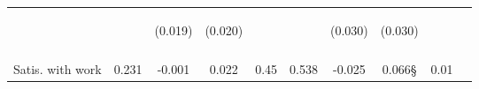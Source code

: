 \begin{tabular}{lccccccccc}
 & \begin{footnotesize}\end{footnotesize} & \begin{footnotesize}(0.019)\end{footnotesize} & \begin{footnotesize}(0.020)\end{footnotesize} & \begin{footnotesize}\end{footnotesize} & \begin{footnotesize}\end{footnotesize} & \begin{footnotesize}(0.030)\end{footnotesize} & \begin{footnotesize}(0.030)\end{footnotesize} & \begin{footnotesize}\end{footnotesize} & \begin{footnotesize}\end{footnotesize}\\
 & \begin{footnotesize}\end{footnotesize} & \begin{footnotesize}[0.032]\end{footnotesize} & \begin{footnotesize}[0.021]\end{footnotesize} & \begin{footnotesize}\end{footnotesize} & \begin{footnotesize}\end{footnotesize} & \begin{footnotesize}[0.753]\end{footnotesize} & \begin{footnotesize}[1.000]\end{footnotesize} & \begin{footnotesize}\end{footnotesize} & \begin{footnotesize}\end{footnotesize}\\
\noalign{\smallskip}Satis. with work & 0.231 & -0.001 & 0.022 & 0.45 & 0.538 & -0.025 & 0.066§ & 0.01 & \\

\end{tabular}
